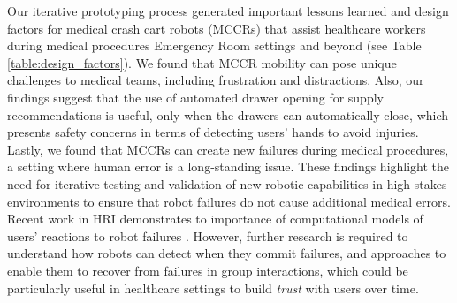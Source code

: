 Our iterative prototyping process generated important lessons learned and design factors for medical crash cart robots (MCCRs) that assist healthcare workers during medical procedures Emergency Room settings and beyond (see Table \ref{table:design_factors}). 
We found that MCCR mobility can pose unique challenges to medical teams, including frustration and distractions. 
Also, our findings suggest that the use of automated drawer opening for supply recommendations is useful, only when the drawers can automatically close, which presents safety concerns in terms of detecting users' hands to avoid injuries. %
Lastly, we found that MCCRs can create new failures during medical procedures, a setting where human error is a long-standing issue. 
These findings highlight the need for iterative testing and validation of new robotic capabilities in high-stakes environments to ensure that robot failures do not cause additional medical errors.
Recent work in HRI demonstrates to importance of computational models of users' reactions to robot failures \cite{honig2022taxonomy,bremers2023bystander,bremers2023facial}.
However, further research is required to understand how robots can detect when they commit failures, and approaches to enable them to recover from failures in group interactions, which could be particularly useful in healthcare settings to build \textit{trust} with users over time.


